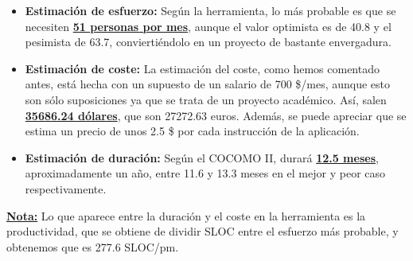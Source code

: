 \documentclass[spanish,a4paper,11pt, twoside]{report}	%
\begin{document}
\vspace{0.35cm}
\hspace{-2.7cm}
\vspace{0.35cm}

\begin{itemize}
	\item{\bfseries{Estimación de esfuerzo:}}
	Según la herramienta, lo más probable es que se necesiten \textbf{\underline{51 personas por mes}}, aunque el valor optimista es de 40.8 y el pesimista de 63.7, conviertiéndolo en un proyecto de bastante envergadura.
	\item{\bfseries{Estimación de coste:}}
	La estimación del coste, como hemos comentado antes, está hecha con un supuesto de un salario de 700 \$/mes, aunque esto son sólo suposiciones ya que se trata de un proyecto académico. Así, salen \textbf{\underline{35686.24 dólares}}, que son 27272.63 euros. Además, se puede apreciar que se estima un precio de unos 2.5 \$ por cada instrucción de la aplicación.
	\item{\bfseries{Estimación de duración:}}
	Según el COCOMO II, durará \textbf{\underline{12.5 meses}}, aproximadamente un año, entre 11.6 y 13.3 meses en el mejor y peor caso respectivamente.
\end{itemize}

\textbf{\underline{Nota:}} Lo que aparece entre la duración y el coste en la herramienta es la productividad, que se obtiene de dividir SLOC entre el esfuerzo más probable, y obtenemos que es 277.6 SLOC/pm.

\newpage
\mbox{}
\thispagestyle{empty}						%
\newpage
\end{document}
